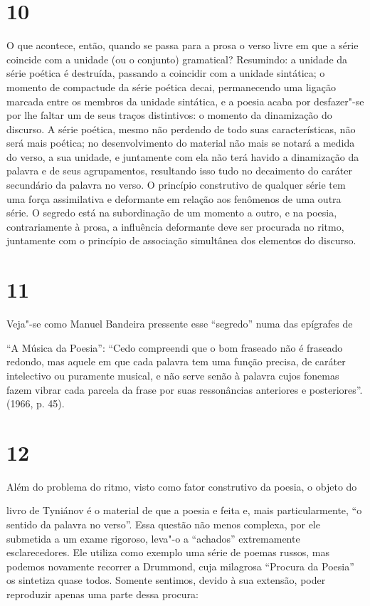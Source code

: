 \section{10}

O que acontece, então, quando se passa para a prosa o verso livre
em que a série coincide com a unidade (ou o conjunto) gramatical? Resumindo: a
unidade da série poética é destruída, passando a coincidir com a unidade
sintática; o momento de compactude da série poética decai, permanecendo
uma ligação marcada entre os membros da unidade sintática, e a poesia
acaba por desfazer"-se por lhe faltar um de seus traços distintivos: o
momento da dinamização do discurso. A série poética, mesmo não perdendo
de todo suas características, não será mais poética; no desenvolvimento
do material não mais se notará a medida do verso, a sua unidade, e
juntamente com ela não terá havido a dinamização da palavra e de seus
agrupamentos, resultando isso tudo no decaimento do caráter secundário
da palavra no verso. O princípio construtivo de qualquer série tem uma
força assimilativa e deformante em relação aos fenômenos de uma outra
série. O segredo está na subordinação de um momento a outro, e na
poesia, contrariamente à prosa, a influência deformante deve ser
procurada no ritmo, juntamente com o princípio de associação simultânea
dos elementos do discurso.

\section{11}

Veja"-se como Manuel Bandeira pressente esse ``segredo'' numa das
epígrafes de

``A Música da Poesia'': ``Cedo compreendi que o bom fraseado não é
fraseado redondo, mas aquele em que cada palavra tem uma função precisa,
de caráter intelectivo ou puramente musical, e não serve senão à palavra
cujos fonemas fazem vibrar cada parcela da frase por suas ressonâncias
anteriores e posteriores''. (1966, p. 45).

\section{12}

Além do problema do ritmo, visto como fator construtivo da poesia, o
objeto do

livro de Tyniánov é o material de que a poesia e feita e, mais
particularmente, ``o sentido da palavra no verso''. Essa questão não
menos complexa, por ele submetida a um exame rigoroso, leva"-o a
``achados'' extremamente esclarecedores. Ele utiliza como exemplo uma
série de poemas russos, mas podemos novamente recorrer a Drummond, cuja
milagrosa ``Procura da Poesia'' os sintetiza quase todos. Somente
sentimos, devido à sua extensão, poder reproduzir apenas uma parte dessa
procura:

